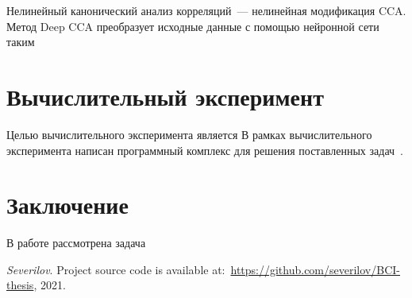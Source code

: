 \documentclass[12pt]{article}
\begin{document}
	Нелинейный канонический анализ корреляций~--- нелинейная модификация CCA. Метод Deep CCA преобразует исходные данные с помощью нейронной сети таким 

	
	\section{Вычислительный эксперимент}
	Целью вычислительного эксперимента является 
	В рамках вычислительного эксперимента написан программный комплекс для решения поставленных задач~\cite{source_code}.

	


	\section{Заключение}
	В работе рассмотрена задача 
	
	
	\begin{thebibliography}{99}
		
	
		\textit{Severilov}. Project source code is available at:~\url{https://github.com/severilov/BCI-thesis}, 2021.
	\end{thebibliography}
	
\end{document}
